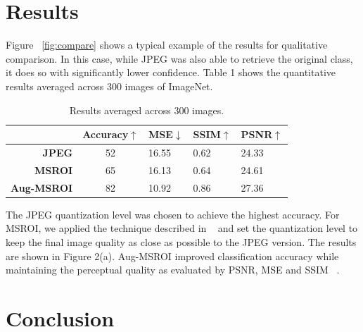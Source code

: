 \section{Results}
Figure ~\ref{fig:compare} shows a typical example of the results for qualitative comparison. In this case, while JPEG was also able to retrieve the original class, it does so with significantly lower confidence. 
Table 1 shows the quantitative results averaged across 300 images of ImageNet.

\begin{table}[H]
\centering
\label{tbl:results}
\begin{tabular}{rclll}
\multicolumn{1}{l}{} & \textbf{Accuracy$\uparrow$} & \textbf{MSE$\downarrow$} & \textbf{SSIM$\uparrow$} & \textbf{PSNR$\uparrow$} \\ \hline
\textbf{JPEG}        & 52                & 16.55        & 0.62          & 24.33         \\
\textbf{MSROI}       & 65                & 16.13        & 0.64          & 24.61         \\
\textbf{Aug-MSROI}   & 82                & 10.92        & 0.86          & 27.36        
\end{tabular}
\caption{Results averaged across $300$ images. }
\end{table}
 

The JPEG quantization level was chosen to achieve the highest accuracy. 
For MSROI, we applied the technique described in ~\cite{Prakash2017SemanticPI} and set the quantization level to keep the final image quality as close as possible to the JPEG version. The results are shown in Figure 2(a). %
Aug-MSROI improved classification accuracy while maintaining the perceptual quality as evaluated by PSNR, MSE and SSIM ~\cite{wang2004image}. %

\section{Conclusion}

